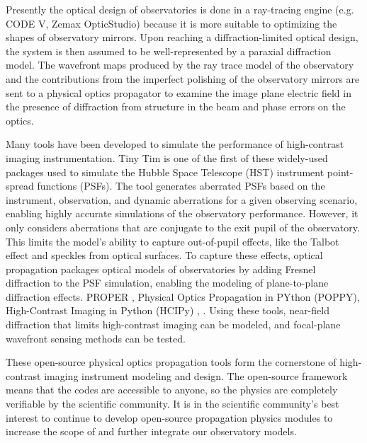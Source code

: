 Presently the optical design of observatories is done in a ray-tracing engine\cite{Howard22,Howard11} (e.g. CODE V, Zemax OpticStudio) because it is more suitable to optimizing the shapes of observatory mirrors. Upon reaching a diffraction-limited optical design, the system is then assumed to be well-represented by a paraxial diffraction model. The wavefront maps produced by the ray trace model of the observatory and the contributions from the imperfect polishing of the observatory mirrors are sent to a physical optics propagator to examine the image plane electric field in the presence of diffraction from structure in the beam and phase errors on the optics. 

Many tools have been developed to simulate the performance of high-contrast imaging instrumentation. Tiny Tim is one of the first of these widely-used packages used to simulate the Hubble Space Telescope (HST)  instrument point-spread functions (PSFs)\cite{Krist93}. The tool generates aberrated PSFs based on the instrument, observation, and dynamic aberrations for a given observing scenario, enabling highly accurate simulations of the observatory performance. However, it only considers aberrations that are conjugate to the exit pupil of the observatory. This limits the model's ability to capture out-of-pupil effects, like the Talbot effect and speckles from optical surfaces\cite{goodman17}. To capture these effects, optical propagation packages  optical models of observatories by adding Fresnel diffraction to the PSF simulation, enabling the modeling of plane-to-plane diffraction effects.  PROPER \cite{Krist07}, Physical Optics Propagation in PYthon (POPPY)\cite{Perrin12,2016ascl.soft02018P,Doug18}, High-Contrast Imaging in Python (HCIPy) \cite{por2018hcipy}, . Using these tools, near-field diffraction that limits high-contrast imaging can be modeled, and focal-plane wavefront sensing methods can be tested. 

These open-source physical optics propagation tools form the cornerstone of high-contrast imaging instrument modeling and design. The open-source framework means that the codes are accessible to anyone, so the physics are completely verifiable by the scientific community\cite{Allen2021OpenSource}. It is in the scientific community's best interest to continue to develop open-source propagation physics modules to increase the scope of and further integrate our observatory models. 

